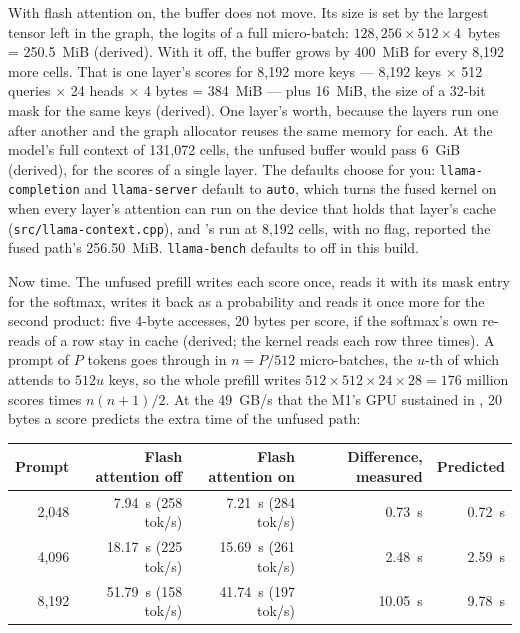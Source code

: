 \noindent With flash attention on, the buffer does not move. Its size is set
by the largest tensor left in the graph, the logits of a full micro-batch:
$128{,}256 \times 512 \times 4$~bytes = 250.5~MiB (derived). With it off, the
buffer grows by 400~MiB for every 8,192 more cells. That is one layer's scores
for 8,192 more keys --- 8,192 keys $\times$ 512 queries $\times$ 24 heads
$\times$ 4 bytes = 384~MiB --- plus 16~MiB, the size of a 32-bit mask for the
same keys (derived). One layer's worth, because the layers run one after
another and the graph allocator reuses the same memory for each. At the model's
full context of 131,072 cells, the unfused buffer would pass 6~GiB (derived),
for the scores of a single layer. The defaults choose for you:
\texttt{llama-completion} and \texttt{llama-server} default to \texttt{auto},
which turns the fused kernel on when every layer's attention can run on the
device that holds that layer's cache (\texttt{src/llama-context.cpp}), and
's run at 8,192 cells, with no flag, reported the fused
path's 256.50~MiB. \texttt{llama-bench} defaults to off in this build.

Now time. The unfused prefill writes each score once, reads it with its mask
entry for the softmax, writes it back as a probability and reads it once more
for the second product: five 4-byte accesses, 20 bytes per score, if the
softmax's own re-reads of a row stay in cache (derived; the kernel reads each
row three times). A prompt of $P$ tokens goes through in $n = P/512$
micro-batches, the $u$-th of which attends to $512u$ keys, so the whole prefill
writes $512 \times 512 \times 24 \times 28 = 176$ million scores times
$n(n+1)/2$. At the 49~GB/s that the M1's GPU sustained in ,
20 bytes a score predicts the extra time of the unfused path:

\begin{center}\small
\begin{tabular}{@{}rrrrr@{}}
\toprule
Prompt & Flash attention off & Flash attention on & Difference, measured & Predicted \\
\midrule
2,048 & 7.94~s (258 tok/s) & 7.21~s (284 tok/s) & 0.73~s & 0.72~s \\
4,096 & 18.17~s (225 tok/s) & 15.69~s (261 tok/s) & 2.48~s & 2.59~s \\
8,192 & 51.79~s (158 tok/s) & 41.74~s (197 tok/s) & 10.05~s & 9.78~s \\
\bottomrule
\end{tabular}
\end{center}

